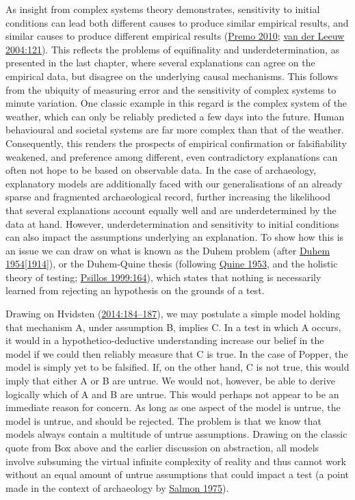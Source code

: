 \documentclass[
  12pt,
  a4paper,
  oneside]{book}
\begin{document}
As insight from complex systems theory demonstrates, sensitivity to initial conditions can lead both different causes to produce similar empirical results, and similar causes to produce different empirical results (\protect\hyperlink{ref-premo2010}{Premo 2010}; \protect\hyperlink{ref-vanderleeuw2004}{van der Leeuw 2004:121}). This reflects the problems of equifinality and underdetermination, as presented in the last chapter, where several explanations can agree on the empirical data, but disagree on the underlying causal mechanisms. This follows from the ubiquity of measuring error and the sensitivity of complex systems to minute variation. One classic example in this regard is the complex system of the weather, which can only be reliably predicted a few days into the future. Human behavioural and societal systems are far more complex than that of the weather. Consequently, this renders the prospects of empirical confirmation or falsifiability weakened, and preference among different, even contradictory explanations can often not hope to be based on observable data. In the case of archaeology, explanatory models are additionally faced with our generalisations of an already sparse and fragmented archaeological record, further increasing the likelihood that several explanations account equally well and are underdetermined by the data at hand. However, underdetermination and sensitivity to initial conditions can also impact the assumptions underlying an explanation. To show how this is an issue we can draw on what is known as the Duhem problem (after \protect\hyperlink{ref-duhem1914}{Duhem 1954{[}1914{]}}), or the Duhem-Quine thesis (following \protect\hyperlink{ref-quine1953}{Quine 1953}, and the holistic theory of testing; \protect\hyperlink{ref-psillos1999}{Psillos 1999:164}), which states that nothing is necessarily learned from rejecting an hypothesis on the grounds of a test.

Drawing on Hvidsten (\protect\hyperlink{ref-hvidsten2014}{2014:184--187}), we may postulate a simple model holding that mechanism A, under assumption B, implies C. In a test in which A occurs, it would in a hypothetico-deductive understanding increase our belief in the model if we could then reliably measure that C is true. In the case of Popper, the model is simply yet to be falsified. If, on the other hand, C is not true, this would imply that either A or B are untrue. We would not, however, be able to derive logically which of A and B are untrue. This would perhaps not appear to be an immediate reason for concern. As long as one aspect of the model is untrue, the model is untrue, and should be rejected. The problem is that we know that models always contain a multitude of untrue assumptions. Drawing on the classic quote from Box above and the earlier discussion on abstraction, all models involve subsuming the virtual infinite complexity of reality and thus cannot work without an equal amount of untrue assumptions that could impact a test (a point made in the context of archaeology by \protect\hyperlink{ref-salmon1975}{Salmon 1975}).
\end{document}
